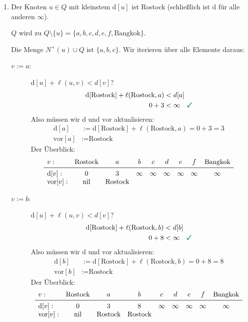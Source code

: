 \documentclass[
a4paper, %
11pt,
]
{scrartcl}
\newcommand{\dist}{\text{d}}
\newcommand{\vor}{\text{vor}}
\newcommand{\nil}{\text{nil}}
\begin{document}
\begin{enumerate}
  \item Der Knoten $u \in Q$ mit kleinstem $\dist[u]$ ist Rostock (schließlich
    ist $\dist$ für alle anderen $\infty$).

    $Q$ wird zu $Q \setminus \{ u \} = \{ a, b, c, d, e, f, \text{Bangkok}\}$.

    Die Menge $N^+(u) \cup Q$ ist $\{ a, b, c \}$.
    Wir iterieren über alle Elemente daraus:
    \begin{description}
      \item[$v := a$:] $\dist[u] + \ell(u, v) < d[v]$?
        \begin{align*}
          \dist[\text{Rostock}] + \ell(\text{Rostock}, a) & < d[a]\\
          0 + 3 & < \infty \quad \richtig
        \end{align*}
        Also müssen wir $\dist$ und $\vor$ aktualisieren:
        \begin{align*}
          \dist[a] & := \dist[\text{Rostock}] + \ell(\text{Rostock}, a)
            = 0 + 3 = 3\\
          \vor[a] & := \text{Rostock}
        \end{align*}
        Der Überblick:
        \begin{align*}
          \begin{array}{lcccccccc}
            v: & \text{Rostock} & a & b & c & d & e & f & \text{Bangkok}\\
            \midrule
            \dist[v]:
              & 0 & 3 & \infty & \infty & \infty & \infty & \infty & \infty\\
            \vor[v]:
              & \nil & \text{Rostock}
          \end{array}
        \end{align*}

      \item[$v := b$:] $\dist[u] + \ell(u, v) < d[v]$?
        \begin{align*}
          \dist[\text{Rostock}] + \ell(\text{Rostock}, b) & < d[b]\\
          0 + 8 & < \infty \quad \richtig
        \end{align*}
        Also müssen wir $\dist$ und $\vor$ aktualisieren:
        \begin{align*}
          \dist[b] & := \dist[\text{Rostock}] + \ell(\text{Rostock}, b)
            = 0 + 8 = 8\\
          \vor[b] & := \text{Rostock}
        \end{align*}
        Der Überblick:
        \begin{align*}
          \begin{array}{lcccccccc}
            v: & \text{Rostock} & a & b & c & d & e & f & \text{Bangkok}\\
            \midrule
            \dist[v]:
              & 0 & 3 & 8 & \infty & \infty & \infty & \infty & \infty\\
            \vor[v]:
              & \nil & \text{Rostock} & \text{Rostock}
          \end{array}
        \end{align*}


\end{description}
\end{enumerate}
\end{document}
